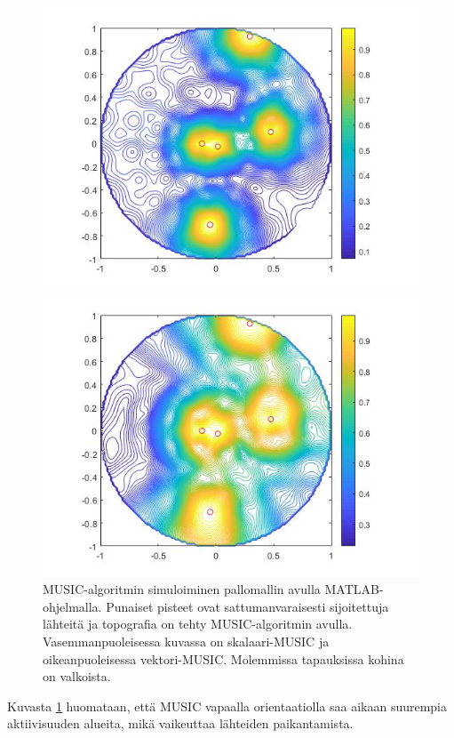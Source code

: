 \clearpage
\begin{figure}[h!]
    \centering
    \begin{minipage}{0.45\textwidth}
        \centering
        \includegraphics[width=1\textwidth]{MUSICfix.jpg}
    \end{minipage}\hfill
    \begin{minipage}{0.45\textwidth}
        \centering
        \includegraphics[width=1\textwidth]{MUSICfree.jpg} 
    \end{minipage}
    \caption{MUSIC-algoritmin simuloiminen pallomallin avulla MATLAB-ohjelmalla. Punaiset pisteet ovat sattumanvaraisesti sijoitettuja lähteitä ja topografia on tehty MUSIC-algoritmin avulla. Vasemmanpuoleisessa kuvassa on skalaari-MUSIC ja oikeanpuoleisessa vektori-MUSIC. Molemmissa tapauksissa kohina on valkoista.}
    \label{fig:MUSIC}
\end{figure}

Kuvasta \ref{fig:MUSIC} huomataan, että MUSIC vapaalla orientaatiolla saa aikaan suurempia aktiivisuuden alueita, mikä vaikeuttaa lähteiden paikantamista.